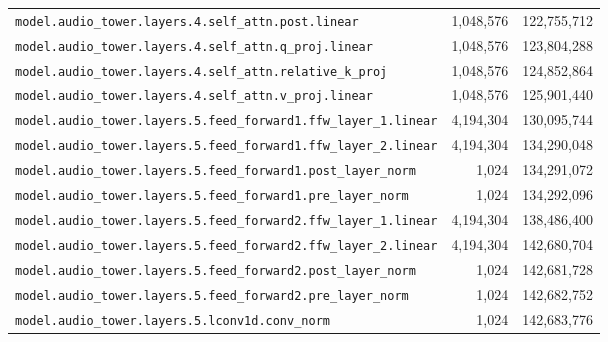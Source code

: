 \documentclass[10pt,a4paper]{article}
\theoremstyle{definition}
\begin{document}
\begin{appendices}
\begin{longtable}{p{9.5cm}rr}
\texttt{model.\allowbreak{}audio\_tower.\allowbreak{}layers.\allowbreak{}4.\allowbreak{}self\_attn.\allowbreak{}post.\allowbreak{}linear} & 1,048,576 & 122,755,712 \\
\texttt{model.\allowbreak{}audio\_tower.\allowbreak{}layers.\allowbreak{}4.\allowbreak{}self\_attn.\allowbreak{}q\_proj.\allowbreak{}linear} & 1,048,576 & 123,804,288 \\
\texttt{model.\allowbreak{}audio\_tower.\allowbreak{}layers.\allowbreak{}4.\allowbreak{}self\_attn.\allowbreak{}relative\_k\_proj} & 1,048,576 & 124,852,864 \\
\texttt{model.\allowbreak{}audio\_tower.\allowbreak{}layers.\allowbreak{}4.\allowbreak{}self\_attn.\allowbreak{}v\_proj.\allowbreak{}linear} & 1,048,576 & 125,901,440 \\
\texttt{model.\allowbreak{}audio\_tower.\allowbreak{}layers.\allowbreak{}5.\allowbreak{}feed\_forward1.\allowbreak{}ffw\_layer\_1.\allowbreak{}linear} & 4,194,304 & 130,095,744 \\
\texttt{model.\allowbreak{}audio\_tower.\allowbreak{}layers.\allowbreak{}5.\allowbreak{}feed\_forward1.\allowbreak{}ffw\_layer\_2.\allowbreak{}linear} & 4,194,304 & 134,290,048 \\
\texttt{model.\allowbreak{}audio\_tower.\allowbreak{}layers.\allowbreak{}5.\allowbreak{}feed\_forward1.\allowbreak{}post\_layer\_norm} & 1,024 & 134,291,072 \\
\texttt{model.\allowbreak{}audio\_tower.\allowbreak{}layers.\allowbreak{}5.\allowbreak{}feed\_forward1.\allowbreak{}pre\_layer\_norm} & 1,024 & 134,292,096 \\
\texttt{model.\allowbreak{}audio\_tower.\allowbreak{}layers.\allowbreak{}5.\allowbreak{}feed\_forward2.\allowbreak{}ffw\_layer\_1.\allowbreak{}linear} & 4,194,304 & 138,486,400 \\
\texttt{model.\allowbreak{}audio\_tower.\allowbreak{}layers.\allowbreak{}5.\allowbreak{}feed\_forward2.\allowbreak{}ffw\_layer\_2.\allowbreak{}linear} & 4,194,304 & 142,680,704 \\
\texttt{model.\allowbreak{}audio\_tower.\allowbreak{}layers.\allowbreak{}5.\allowbreak{}feed\_forward2.\allowbreak{}post\_layer\_norm} & 1,024 & 142,681,728 \\
\texttt{model.\allowbreak{}audio\_tower.\allowbreak{}layers.\allowbreak{}5.\allowbreak{}feed\_forward2.\allowbreak{}pre\_layer\_norm} & 1,024 & 142,682,752 \\
\texttt{model.\allowbreak{}audio\_tower.\allowbreak{}layers.\allowbreak{}5.\allowbreak{}lconv1d.\allowbreak{}conv\_norm} & 1,024 & 142,683,776 \\

\end{longtable}
\end{appendices}
\end{document}
